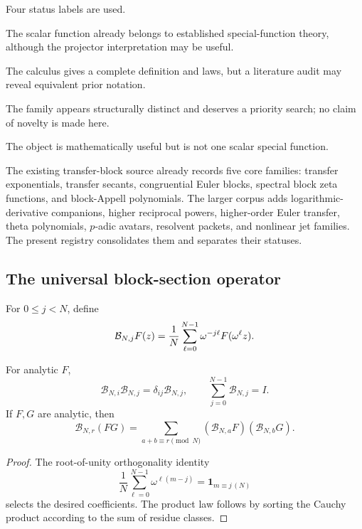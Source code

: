 Four status labels are used.
\begin{description}[style=nextline]
\item[Classical boundary.] The scalar function already belongs to established special-function theory, although the projector interpretation may be useful.
\item[Explicit derived family.] The calculus gives a complete definition and laws, but a literature audit may reveal equivalent prior notation.
\item[Candidate-new family.] The family appears structurally distinct and deserves a priority search; no claim of novelty is made here.
\item[Operator or construction schema.] The object is mathematically useful but is not one scalar special function.
\end{description}

The existing transfer-block source already records five core families: transfer exponentials, transfer secants, congruential Euler blocks, spectral block zeta functions, and block-Appell polynomials.  The larger corpus adds logarithmic-derivative companions, higher reciprocal powers, higher-order Euler transfer, theta polynomials, $p$-adic avatars, resolvent packets, and nonlinear jet families.  The present registry consolidates them and separates their statuses.

\subsection{The universal block-section operator}

\begin{definition}
For $0\le j<N$, define
\[
\mathcal B_{N,j} F(z)=\frac1N\sum_{\ell=0}^{N-1}\omega^{-j\ell}F(\omega^\ell z).
\]
\end{definition}

\begin{proposition}
For analytic $F$,
\[
\mathcal B_{N,i}\mathcal B_{N,j}=\delta_{ij}\mathcal B_{N,j},
\qquad
\sum_{j=0}^{N-1}\mathcal B_{N,j}=I.
\]
If $F,G$ are analytic, then
\[
\mathcal B_{N,r}(FG)
=\sum_{a+b\equiv r\pmod N}
(\mathcal B_{N,a}F)(\mathcal B_{N,b}G).
\]
\end{proposition}

\begin{proof}
The root-of-unity orthogonality identity
\[
\frac1N\sum_{\ell=0}^{N-1}\omega^{\ell(m-j)}
=\mathbf 1_{m\equiv j\, (N)}
\]
selects the desired coefficients.  The product law follows by sorting the Cauchy product according to the sum of residue classes.
\end{proof}

